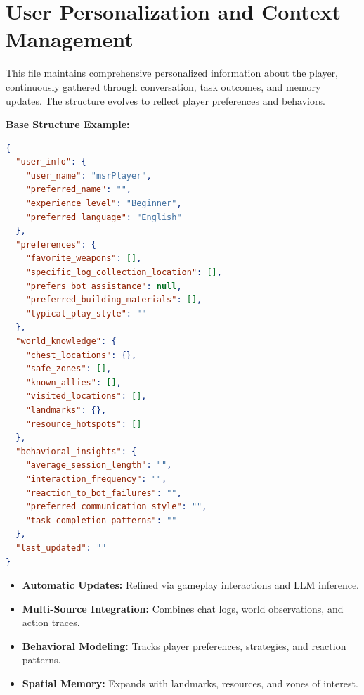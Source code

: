 \FloatBarrier
\appxsep



\section{User Personalization and Context Management}
\label{app:usercontext}

\appxsmallsep
\noindent
\begin{tcolorbox}[appxbox,
  title=Structured User Data Format (\texttt{user\_data.json}), fonttitle=\bfseries]
This file maintains comprehensive personalized information about the player, continuously gathered through conversation, task outcomes, and memory updates. The structure evolves to reflect player preferences and behaviors.
\medskip

\textbf{Base Structure Example:}
\begin{lstlisting}[language=json, basicstyle=\ttfamily\scriptsize]
{
  "user_info": {
    "user_name": "msrPlayer",
    "preferred_name": "",
    "experience_level": "Beginner",
    "preferred_language": "English"
  },
  "preferences": {
    "favorite_weapons": [],
    "specific_log_collection_location": [],
    "prefers_bot_assistance": null,
    "preferred_building_materials": [],
    "typical_play_style": ""
  },
  "world_knowledge": {
    "chest_locations": {},
    "safe_zones": [],
    "known_allies": [],
    "visited_locations": [],
    "landmarks": {},
    "resource_hotspots": []
  },
  "behavioral_insights": {
    "average_session_length": "",
    "interaction_frequency": "",
    "reaction_to_bot_failures": "",
    "preferred_communication_style": "",
    "task_completion_patterns": ""
  },
  "last_updated": ""
}
\end{lstlisting}
\end{tcolorbox}

\appxsmallsep
\noindent
\begin{tcolorbox}[appxbox, title=Dynamic Evolution Characteristics, fonttitle=\bfseries]
\begin{itemize}
  \item \textbf{Automatic Updates:} Refined via gameplay interactions and LLM inference.
  \item \textbf{Multi-Source Integration:} Combines chat logs, world observations, and action traces.
  \item \textbf{Behavioral Modeling:} Tracks player preferences, strategies, and reaction patterns.
  \item \textbf{Spatial Memory:} Expands with landmarks, resources, and zones of interest.
\end{itemize}
\end{tcolorbox}

